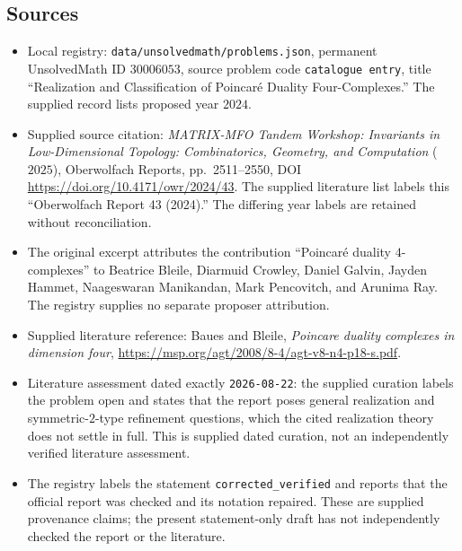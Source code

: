 \documentclass[11pt]{article}
\begin{document}
\subsection{Sources}
\begin{itemize}
\item Local registry: \texttt{data/unsolvedmath/problems.json}, permanent UnsolvedMath ID $30006053$, source problem code \texttt{catalogue entry}, title ``Realization and Classification of Poincar\'e Duality Four-Complexes.'' The supplied record lists proposed year $2024$.
\item Supplied source citation: \emph{MATRIX-MFO Tandem Workshop: Invariants in Low-Dimensional Topology: Combinatorics, Geometry, and Computation} ($2025$), Oberwolfach Reports, pp.\ 2511--2550, DOI \url{https://doi.org/10.4171/owr/2024/43}. The supplied literature list labels this ``Oberwolfach Report 43 (2024).'' The differing year labels are retained without reconciliation.
\item The original excerpt attributes the contribution ``Poincar\'e duality $4$-complexes'' to Beatrice Bleile, Diarmuid Crowley, Daniel Galvin, Jayden Hammet, Naageswaran Manikandan, Mark Pencovitch, and Arunima Ray. The registry supplies no separate proposer attribution.
\item Supplied literature reference: Baues and Bleile, \emph{Poincare duality complexes in dimension four}, \url{https://msp.org/agt/2008/8-4/agt-v8-n4-p18-s.pdf}.
\item Literature assessment dated exactly \texttt{2026-08-22}: the supplied curation labels the problem open and states that the report poses general realization and symmetric-$2$-type refinement questions, which the cited realization theory does not settle in full. This is supplied dated curation, not an independently verified literature assessment.
\item The registry labels the statement \texttt{corrected\_verified} and reports that the official report was checked and its notation repaired. These are supplied provenance claims; the present statement-only draft has not independently checked the report or the literature.
\end{itemize}
\end{document}
